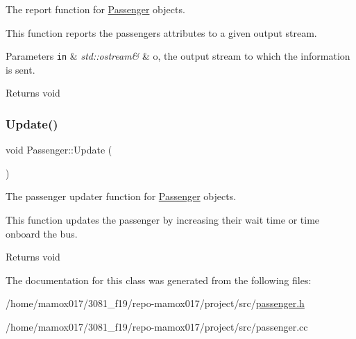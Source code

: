 The report function for \hyperlink{classPassenger}{Passenger} objects. 

This function reports the passenger\textquotesingle{}s attributes to a given output stream.


\begin{DoxyParams}[1]{Parameters}
\mbox{\tt in}  & {\em std\+::ostream\&} & o, the output stream to which the information is sent.\\
\hline
\end{DoxyParams}
\begin{DoxyReturn}{Returns}
void 
\end{DoxyReturn}
\mbox{\label{classPassenger_a960de3b29fc17a2c2d79c0b79d5cf299}} 
\subsubsection{\texorpdfstring{Update()}{Update()}}
{\footnotesize\ttfamily void Passenger\+::\+Update (\begin{DoxyParamCaption}{ }\end{DoxyParamCaption})}



The passenger updater function for \hyperlink{classPassenger}{Passenger} objects. 

This function updates the passenger by increasing their wait time or time onboard the bus.

\begin{DoxyReturn}{Returns}
void 
\end{DoxyReturn}


The documentation for this class was generated from the following files\+:\begin{DoxyCompactItemize}
\item 
/home/mamox017/3081\+\_\+f19/repo-\/mamox017/project/src/\hyperlink{passenger_8h}{passenger.\+h}\item 
/home/mamox017/3081\+\_\+f19/repo-\/mamox017/project/src/passenger.\+cc\end{DoxyCompactItemize}
